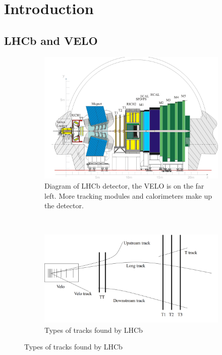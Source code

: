 
\chapter{Introduction}

\graphicspath{{Figs/}}


\section{LHCb and VELO} %

\begin{figure}[h] %
\centering
\begin{subfigure}[t]{0.45\textwidth}
\centering
\includegraphics[width=\textwidth]{LHCbDiagram}
\caption{Diagram of LHCb detector, the VELO is on the far left. More tracking modules and calorimeters make up the detector.} 
\label{fig:LHCbDiagram} 
\end{subfigure}
~
\begin{subfigure}[t]{0.45\textwidth}
\includegraphics[width=\textwidth]{LHCbTracking}
\caption{Types of tracks found by LHCb} 
\label{fig:LHCbTracking}
\end{subfigure}
\end{figure}

